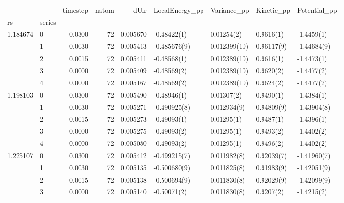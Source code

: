 \begin{tabular}{llrrrllll}
\toprule
         &   &  timestep &  natom &      dUlr & LocalEnergy\_pp &     Variance\_pp &     Kinetic\_pp &   Potential\_pp \\
rs & series &           &        &           &                &                 &                &                \\
\midrule
1.184674 & 0 &    0.0300 &     72 &  0.005670 &    -0.48422(1) &      0.01254(2) &      0.9616(1) &     -1.4459(1) \\
         & 1 &    0.0030 &     72 &  0.005413 &   -0.485676(9) &    0.012399(10) &     0.96117(9) &    -1.44684(9) \\
         & 2 &    0.0015 &     72 &  0.005411 &    -0.48568(1) &    0.012389(10) &      0.9616(1) &     -1.4473(1) \\
         & 3 &    0.0000 &     72 &  0.005409 &    -0.48569(2) &    0.012389(10) &      0.9620(2) &     -1.4477(2) \\
         & 4 &    0.0000 &     72 &  0.005167 &    -0.48569(2) &    0.012389(10) &      0.9624(2) &     -1.4477(2) \\
1.198103 & 0 &    0.0300 &     72 &  0.005490 &    -0.48946(1) &      0.01307(2) &      0.9490(1) &     -1.4384(1) \\
         & 1 &    0.0030 &     72 &  0.005271 &   -0.490925(8) &     0.012934(9) &     0.94809(9) &    -1.43904(8) \\
         & 2 &    0.0015 &     72 &  0.005273 &    -0.49093(1) &      0.01295(1) &      0.9487(1) &     -1.4396(1) \\
         & 3 &    0.0000 &     72 &  0.005275 &    -0.49093(2) &      0.01295(1) &      0.9493(2) &     -1.4402(2) \\
         & 4 &    0.0000 &     72 &  0.005080 &    -0.49093(2) &      0.01295(1) &      0.9496(2) &     -1.4402(2) \\
1.225107 & 0 &    0.0300 &     72 &  0.005412 &   -0.499215(7) &     0.011982(8) &     0.92039(7) &    -1.41960(7) \\
         & 1 &    0.0030 &     72 &  0.005135 &   -0.500680(9) &     0.011825(8) &     0.91983(9) &    -1.42051(9) \\
         & 2 &    0.0015 &     72 &  0.005138 &   -0.500694(9) &     0.011830(8) &     0.92029(9) &    -1.42099(9) \\
         & 3 &    0.0000 &     72 &  0.005140 &    -0.50071(2) &     0.011830(8) &      0.9207(2) &     -1.4215(2) \\

\end{tabular}
